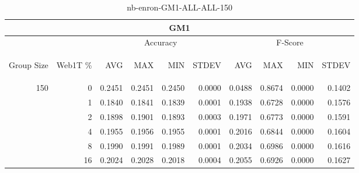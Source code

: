 \begin{center}
\begin{table}[htbp] 
 \begin{center}
\begin{tabular}{ | r | r | r | r | r | r | r | r | r | r |}
\hline
\multicolumn{10}{|c|}{GM1}\\
\hline
 & & \multicolumn{4}{|c|}{Accuracy} & \multicolumn{4}{|c|}{F-Score}\\ \cline{3-10}
\begin{sideways}Group Size\end{sideways} & \begin{sideways}Web1T \%\end{sideways} & \begin{sideways}AVG\end{sideways} & \begin{sideways}MAX\end{sideways} & \begin{sideways}MIN\end{sideways} & \begin{sideways}STDEV\end{sideways} & \begin{sideways}AVG\end{sideways} & \begin{sideways}MAX\end{sideways} & \begin{sideways}MIN\end{sideways} & \begin{sideways}STDEV\end{sideways}\\
\hline
\multirow{5}{*}{150}
 & 0 & 0.2451 & 0.2451 & 0.2450 & 0.0000 & 0.0488 & 0.8674 & 0.0000 & 0.1402\\ \cline{2-10}
 & 1 & 0.1840 & 0.1841 & 0.1839 & 0.0001 & 0.1938 & 0.6728 & 0.0000 & 0.1576\\ \cline{2-10}
 & 2 & 0.1898 & 0.1901 & 0.1893 & 0.0003 & 0.1971 & 0.6773 & 0.0000 & 0.1591\\ \cline{2-10}
 & 4 & 0.1955 & 0.1956 & 0.1955 & 0.0001 & 0.2016 & 0.6844 & 0.0000 & 0.1604\\ \cline{2-10}
 & 8 & 0.1990 & 0.1991 & 0.1989 & 0.0001 & 0.2034 & 0.6986 & 0.0000 & 0.1616\\ \cline{2-10}
 & 16 & 0.2024 & 0.2028 & 0.2018 & 0.0004 & 0.2055 & 0.6926 & 0.0000 & 0.1627\\ \cline{2-10}
\hline
\end{tabular}
\caption{nb-enron-GM1-ALL-ALL-150}
\label{table:nb-enron-GM1-ALL-ALL-150}
\end{center}
 \end{table}
\end{center}


